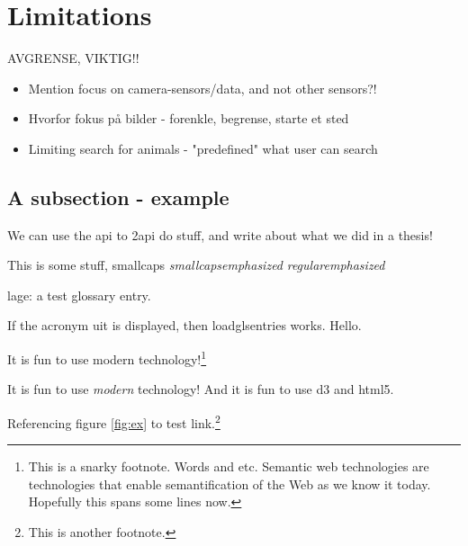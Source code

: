 \documentclass[USenglish]{uit-thesis}
\begin{document}
\section{Limitations}
AVGRENSE, VIKTIG!!

\begin{itemize}
\item Mention focus on camera-sensors/data, and not other sensors?!
\item Hvorfor fokus på bilder - forenkle, begrense, starte et sted
\item Limiting search for animals - "predefined" what user can search
\end{itemize}






\iffalse
\subsection{A subsection - example}
We can use the \ac{api} to \ac{2api} do stuff, and write about what we did in a \gls{thesis}!

This is some stuff, {\sc smallcaps {\em smallcapsemphasized}} {\em regularemphasized}

\Gls{lage}: a test glossary entry.

If the acronym \ac{uit} is displayed, then loadglsentries works.
Hello.

It is fun to use modern  technology!\footnote{This is a snarky footnote. Words and etc. Semantic web technologies are technologies that enable semantification of the Web as we know it today. Hopefully this spans some lines now.}

It is fun to use \emph{modern } technology! And it is fun to use \ac{d3} and \ac{html5}.

Referencing figure \ref{fig:ex} to test link.\footnote{This is another
footnote.}
\end{document}
